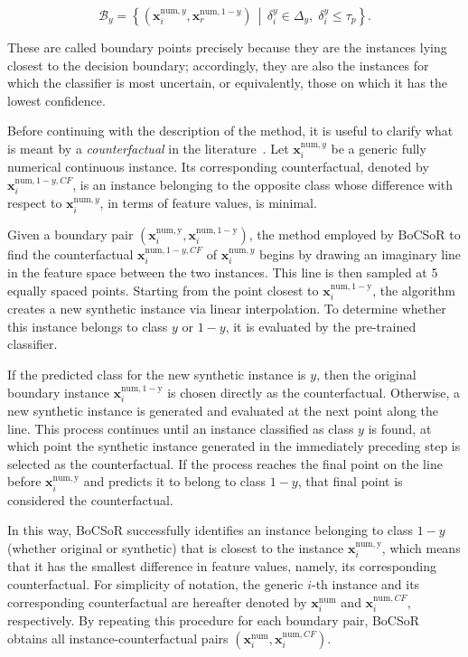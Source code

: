 \begin{equation}
  \mathcal{B}_y = \left\{ \left(\mathbf{x}^{\mathrm{num}, y}_i, \mathbf{x}^{\mathrm{num}, 1-y}_r\right) \, \middle| \, \delta_i^y \in \Delta_y,\; \delta_i^y \leq \tau_p \right\}.
\end{equation}

These are called boundary points precisely because they are the instances lying closest to the decision boundary; accordingly, they are also the instances for which the classifier is most uncertain, or equivalently, those on which it has the lowest confidence.  

Before continuing with the description of the method, it is useful to clarify what is meant by a \emph{counterfactual} in the literature~\cite{wachter2017counterfactual}. Let $\mathbf{x}^{\mathrm{num}, y}_i$ be a generic fully numerical continuous instance. Its corresponding counterfactual, denoted by $\mathbf{x}_i^{\mathrm{num}, 1-y, CF}$, is an instance belonging to the opposite class whose difference with respect to $\mathbf{x}^{\mathrm{num}, y}_i$, in terms of feature values, is minimal. 

Given a boundary pair $(\mathbf{x}^{\mathrm{num, y}}_i, \mathbf{x}^{\mathrm{num, 1-y}}_i)$, the method employed by BoCSoR to find the counterfactual $\mathbf{x}_i^{\mathrm{num}, 1-y, CF}$ of $\mathbf{x}^{\mathrm{num}, y}_i$ begins by drawing an imaginary line in the feature space between the two instances. This line is then sampled at 5 equally spaced points. Starting from the point closest to $\mathbf{x}^{\mathrm{num, 1-y}}_i$, the algorithm creates a new synthetic instance via linear interpolation. To determine whether this instance belongs to class $y$ or $1-y$, it is evaluated by the pre-trained classifier. 

If the predicted class for the new synthetic instance is $y$, then the original boundary instance $\mathbf{x}^{\mathrm{num, 1-y}}_i$ is chosen directly as the counterfactual. Otherwise, a new synthetic instance is generated and evaluated at the next point along the line. This process continues until an instance classified as class $y$ is found, at which point the synthetic instance generated in the immediately preceding step is selected as the counterfactual. If the process reaches the final point on the line before $\mathbf{x}^{\mathrm{num, y}}_i$ and predicts it to belong to class $1-y$, that final point is considered the counterfactual. 

In this way, BoCSoR successfully identifies an instance belonging to class $1-y$ (whether original or synthetic) that is closest to the instance $\mathbf{x}^{\mathrm{num, y}}_i$, which means that it has the smallest difference in feature values, namely, its corresponding counterfactual. For simplicity of notation, the generic $i$-th instance and its corresponding counterfactual are hereafter denoted by $\mathbf{x}^{\mathrm{num}}_i$ and $\mathbf{x}_i^{\mathrm{num}, CF}$, respectively. By repeating this procedure for each boundary pair, BoCSoR obtains all instance-counterfactual pairs $(\mathbf{x}^{\mathrm{num}}_i, \mathbf{x}_i^{\mathrm{num}, CF})$.

